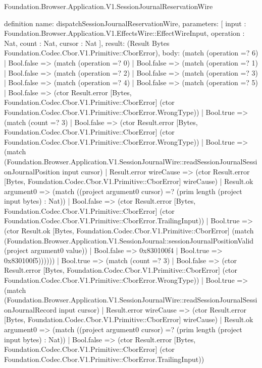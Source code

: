 \begin{lexlean}{Foundation.Browser.Application.V1.SessionJournalReservationWire}
\begin{semanticmodule}
definition{
  name: dispatchSessionJournalReservationWire,
  parameters: [
    input : Foundation.Browser.Application.V1.EffectsWire::EffectWireInput,
    operation : Nat,
    count : Nat,
    cursor : Nat
  ],
  result: (Result Bytes Foundation.Codec.Cbor.V1.Primitive::CborError),
  body: (match (operation =? 6)
    | Bool.false => (match (operation =? 0)
      | Bool.false => (match (operation =? 1)
        | Bool.false => (match (operation =? 2)
          | Bool.false => (match (operation =? 3)
            | Bool.false => (match (operation =? 4)
              | Bool.false => (match (operation =? 5)
                | Bool.false => (ctor Result.error [Bytes, Foundation.Codec.Cbor.V1.Primitive::CborError] (ctor Foundation.Codec.Cbor.V1.Primitive::CborError.WrongType))
                | Bool.true => (match (count =? 3)
                  | Bool.false => (ctor Result.error [Bytes, Foundation.Codec.Cbor.V1.Primitive::CborError] (ctor Foundation.Codec.Cbor.V1.Primitive::CborError.WrongType))
                  | Bool.true => (match (Foundation.Browser.Application.V1.SessionJournalWire::readSessionJournalSessionJournalPosition input cursor)
                    | Result.error wireCause => (ctor Result.error [Bytes, Foundation.Codec.Cbor.V1.Primitive::CborError] wireCause)
                    | Result.ok argument0 => (match ((project argument0 cursor) =? (prim length (project input bytes) : Nat))
                      | Bool.false => (ctor Result.error [Bytes, Foundation.Codec.Cbor.V1.Primitive::CborError] (ctor Foundation.Codec.Cbor.V1.Primitive::CborError.TrailingInput))
                      | Bool.true => (ctor Result.ok [Bytes, Foundation.Codec.Cbor.V1.Primitive::CborError] (match (Foundation.Browser.Application.V1.SessionJournal::sessionJournalPositionValid (project argument0 value))
                        | Bool.false => 0x830100f4
                        | Bool.true => 0x830100f5))))))
              | Bool.true => (match (count =? 3)
                | Bool.false => (ctor Result.error [Bytes, Foundation.Codec.Cbor.V1.Primitive::CborError] (ctor Foundation.Codec.Cbor.V1.Primitive::CborError.WrongType))
                | Bool.true => (match (Foundation.Browser.Application.V1.SessionJournalWire::readSessionJournalSessionJournalRecord input cursor)
                  | Result.error wireCause => (ctor Result.error [Bytes, Foundation.Codec.Cbor.V1.Primitive::CborError] wireCause)
                  | Result.ok argument0 => (match ((project argument0 cursor) =? (prim length (project input bytes) : Nat))
                    | Bool.false => (ctor Result.error [Bytes, Foundation.Codec.Cbor.V1.Primitive::CborError] (ctor Foundation.Codec.Cbor.V1.Primitive::CborError.TrailingInput))
}
\end{semanticmodule}
\end{lexlean}
